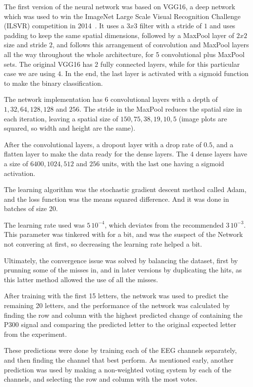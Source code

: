 \documentclass[conference]{IEEEtran}
\begin{document}
The first version of the neural network was based on VGG16, a deep network which was used to win the ImageNet Large Scale Visual Recognition Challenge (ILSVR) competition in 2014~\cite{ilsvr2014}. It uses a $3x3$ filter with a stride of $1$ and uses padding to keep the same spatial dimensions, followed by a MaxPool layer of $2x2$ size and stride $2$, and follows this arrangement of convolution and MaxPool layers all the way throughout the whole architecture, for 5 convolutional plus MaxPool sets. The original VGG16 has $2$ fully connected layers, while for this particular case we are using $4$. In the end, the last layer is activated with a sigmoid function to make the binary classification. 

The network implementation has $6$ convolutional layers with a depth of $1, 32, 64, 128, 128$ and $256$. The stride in the MaxPool reduces the spatial size in each iteration, leaving a spatial size of $150, 75, 38, 19, 10, 5$ (image plots are squared, so width and height are the same). 

After the convolutional layers, a dropout layer with a drop rate of $0.5$, and a flatten layer to make the data ready for the dense layers. The $4$ dense layers have a size of $6400, 1024, 512$ and $256$ units, with the last one having a sigmoid activation.

The learning algorithm was the stochastic gradient descent method called Adam\cite{adam2014}, and the loss function was the means squared difference. And it was done in batches of size 20. 

The learning rate used was $5\,10^{-4}$, which deviates from the recommended $3\, 10^{-3}$. This parameter was tinkered with for a bit, and was the suspect of the Network not convering at first, so decreasing the learning rate helped a bit.

Ultimately, the convergence issue was solved by balancing the dataset, first by prunning some of the misses in, and in later versions by duplicating the hits, as this latter method allowed the use of all the misses.

After training with the first 15 letters, the network was used to predict the remaining 20 letters, and the performance of the network was calculated by finding the row and column with the highest predicted change of containing the P300 signal and comparing the predicted letter to the original expected letter from the experiment.

These predictions were done by training each of the EEG channels separately, and then finding the channel that best perform. As mentioned early, another prediction was used by making a non-weighted voting system by each of the channels, and selecting the row and column with the most votes.
\end{document}
